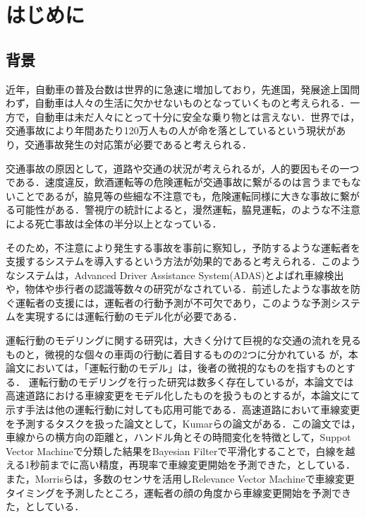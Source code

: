 \chapter{はじめに}
\section{背景}
近年，自動車の普及台数は世界的に急速に増加\cite{who}しており，先進国，発展途上国問わず，自動車は人々の生活に欠かせないものとなっていくものと考えられる．一方で，自動車は未だ人々にとって十分に安全な乗り物とは言えない．世界では，交通事故により年間あたり120万人もの人が命を落としているという現状があり\cite{who}，交通事故発生の対応策が必要であると考えられる．
\par
交通事故の原因として，道路や交通の状況が考えられるが，人的要因もその一つである．速度違反，飲酒運転等の危険運転が交通事故に繋がるのは言うまでもないことであるが，脇見等の些細な不注意でも，危険運転同様に大きな事故に繋がる可能性がある．警視庁の統計によると，漫然運転，脇見運転，のような不注意による死亡事故は全体の半分以上となっている\cite{keishicho}．
\par
そのため，不注意により発生する事故を事前に察知し，予防するような運転者を支援するシステムを導入するという方法が効果的であると考えられる．このようなシステムは，Advanced Driver Assistance System(ADAS)とよばれ車線検出\cite{yoo}や，物体や歩行者の認識\cite{Musleh}等数々の研究がなされている．前述したような事故を防ぐ運転者の支援には，運転者の行動予測が不可欠であり，このような予測システムを実現するには運転行動のモデル化が必要である．
\par
運転行動のモデリングに関する研究は，大きく分けて巨視的な交通の流れを見るものと，微視的な個々の車両の行動に着目するものの2つに分かれている
\cite{flow}
が，本論文においては，「運転行動のモデル」は，後者の微視的なものを指すものとする．
運転行動のモデリングを行った研究は数多く存在しているが，本論文では高速道路における車線変更をモデル化したものを扱うものとするが，本論文にて示す手法は他の運転行動に対しても応用可能である．高速道路において車線変更を予測するタスクを扱った論文として，Kumar\cite{kumar}らの論文がある．この論文では，車線からの横方向の距離と，ハンドル角とその時間変化を特徴として，Suppot Vector Machineで分類した結果をBayesian Filterで平滑化することで，白線を越える1秒前までに高い精度，再現率で車線変更開始を予測できた，としている．また，Morris\cite{morris}らは，多数のセンサを活用しRelevance Vector Machineで車線変更タイミングを予測したところ，運転者の顔の角度から車線変更開始を予測できた，としている．
